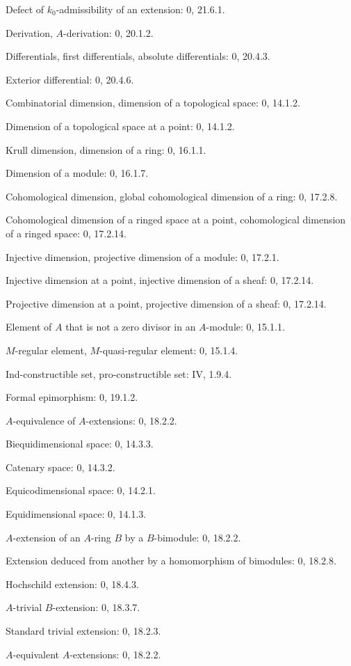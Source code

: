 Defect of $k_0$-admissibility of an extension: 0, 21.6.1.\par
Derivation, $A$-derivation: 0, 20.1.2.\par
Differentials, first differentials, absolute differentials: 0, 20.4.3.\par
Exterior differential: 0, 20.4.6.\par
Combinatorial dimension, dimension of a topological space: 0, 14.1.2.\par
Dimension of a topological space at a point: 0, 14.1.2.\par
Krull dimension, dimension of a ring: 0, 16.1.1.\par
Dimension of a module: 0, 16.1.7.\par
Cohomological dimension, global cohomological dimension of a ring: 0, 17.2.8.\par
Cohomological dimension of a ringed space at a point, cohomological dimension of a ringed space: 0, 17.2.14.\par

\clearpage
{}
Injective dimension, projective dimension of a module: 0, 17.2.1.\par
Injective dimension at a point, injective dimension of a sheaf: 0, 17.2.14.\par
Projective dimension at a point, projective dimension of a sheaf: 0, 17.2.14.\par

Element of $A$ that is not a zero divisor in an $A$-module: 0, 15.1.1.\par
$M$-regular element, $M$-quasi-regular element: 0, 15.1.4.\par
Ind-constructible set, pro-constructible set: IV, 1.9.4.\par
Formal epimorphism: 0, 19.1.2.\par
$A$-equivalence of $A$-extensions: 0, 18.2.2.\par
Biequidimensional space: 0, 14.3.3.\par
Catenary space: 0, 14.3.2.\par
Equicodimensional space: 0, 14.2.1.\par
Equidimensional space: 0, 14.1.3.\par
$A$-extension of an $A$-ring $B$ by a $B$-bimodule: 0, 18.2.2.\par
Extension deduced from another by a homomorphism of bimodules: 0, 18.2.8.\par
Hochschild extension: 0, 18.4.3.\par
$A$-trivial $B$-extension: 0, 18.3.7.\par
Standard trivial extension: 0, 18.2.3.\par
$A$-equivalent $A$-extensions: 0, 18.2.2.\par

